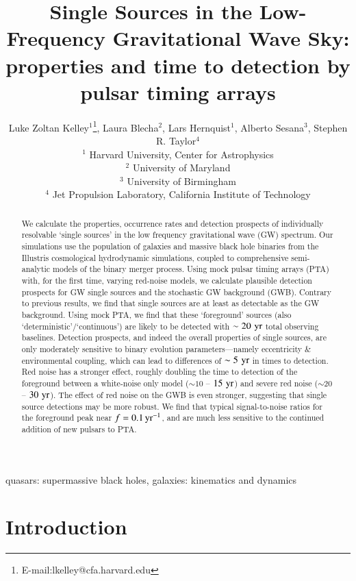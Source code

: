 \documentclass[useAMS, usenatbib]{mnras}  %
\title[PTA GW Singles]{Single Sources in the Low-Frequency Gravitational Wave Sky:\\properties and time to detection by pulsar timing arrays}
\author[L.Z.~Kelley et al.]{
    \hspace{-0.054in}Luke Zoltan Kelley$^{1}$\thanks{E-mail:lkelley@cfa.harvard.edu},
	Laura Blecha$^{2}$,
    \newauthor
	Lars Hernquist$^{1}$,
	Alberto Sesana$^{3}$,
	Stephen R. Taylor$^{4}$
    \vspace{0.1in} \\
    $^{1}$ Harvard University, Center for Astrophysics \\
    $^{2}$ University of Maryland \\
    $^{3}$ University of Birmingham \\
    $^{4}$ Jet Propulsion Laboratory, California Institute of Technology
}
\begin{document}
\pagerange{\pageref{firstpage}--\pageref{lastpage}} 

\maketitle
\label{firstpage}

\begin{abstract}
    We calculate the properties, occurrence rates and detection prospects of individually resolvable `single sources' in the low frequency gravitational wave (GW) spectrum.  Our simulations use the population of galaxies and massive black hole binaries from the Illustris cosmological hydrodynamic simulations, coupled to comprehensive semi-analytic models of the binary merger process.  Using mock pulsar timing arrays (PTA) with, for the first time, varying red-noise models, we calculate plausible detection prospects for GW single sources and the stochastic GW background (GWB).  Contrary to previous results, we find that single sources are at least as detectable as the GW background.  Using mock PTA, we find that these `foreground' sources (also `deterministic'/`continuous') are likely to be detected with $\sim 20 \, \,\mathrm{yr}$ total observing baselines.  Detection prospects, and indeed the overall properties of single sources, are only moderately sensitive to binary evolution parameters---namely eccentricity \& environmental coupling, which can lead to differences of $\sim 5 \, \,\mathrm{yr}$ in times to detection.  Red noise has a stronger effect, roughly doubling the time to detection of the foreground between a white-noise only model ($\sim 10$ -- $15 \, \,\mathrm{yr}$) and severe red noise ($\sim 20$ -- $30 \, \,\mathrm{yr}$).  The effect of red noise on the GWB is even stronger, suggesting that single source detections may be more robust.  We find that typical signal-to-noise ratios for the foreground peak near $f = 0.1 \, \textrm{yr}^{-1}$, and are much less sensitive to the continued addition of new pulsars to PTA.
\end{abstract}

\begin{keywords}
quasars: supermassive black holes, galaxies: kinematics and dynamics
\end{keywords}

\section{Introduction}
\end{document}
